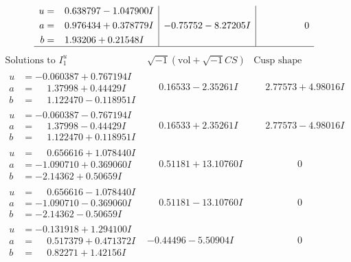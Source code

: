 \documentclass[1p]{elsarticle_modified}
\theoremstyle{definition}
\newcommand{\I}{\sqrt{-1}}
\begin{document}
$$\begin{array}{c|c|c}
\begin{aligned}
u &= \phantom{-}0.638797 - 1.047900 I \\
a &= \phantom{-}0.976434 + 0.378779 I \\
b &= \phantom{-}1.93206 + 0.21548 I\end{aligned}
 & -0.75752 - 8.27205 I & \phantom{-0.000000 } 0\\
 \hline 
 \end{array}$$\newpage$$\begin{array}{c|c|c}  
\text{Solutions to }I^u_{1}& \I (\text{vol} + \sqrt{-1}CS) & \text{Cusp shape}\\
 \hline 
\begin{aligned}
u &= -0.060387 + 0.767194 I \\
a &= \phantom{-}1.37998 + 0.44429 I \\
b &= \phantom{-}1.122470 - 0.118951 I\end{aligned}
 & \phantom{-}0.16533 - 2.35261 I & \phantom{-}2.77573 + 4.98016 I \\ \hline\begin{aligned}
u &= -0.060387 - 0.767194 I \\
a &= \phantom{-}1.37998 - 0.44429 I \\
b &= \phantom{-}1.122470 + 0.118951 I\end{aligned}
 & \phantom{-}0.16533 + 2.35261 I & \phantom{-}2.77573 - 4.98016 I \\ \hline\begin{aligned}
u &= \phantom{-}0.656616 + 1.078440 I \\
a &= -1.090710 + 0.369060 I \\
b &= -2.14362 + 0.50659 I\end{aligned}
 & \phantom{-}0.51181 + 13.10760 I & \phantom{-0.000000 } 0 \\ \hline\begin{aligned}
u &= \phantom{-}0.656616 - 1.078440 I \\
a &= -1.090710 - 0.369060 I \\
b &= -2.14362 - 0.50659 I\end{aligned}
 & \phantom{-}0.51181 - 13.10760 I & \phantom{-0.000000 } 0 \\ \hline\begin{aligned}
u &= -0.131918 + 1.294100 I \\
a &= \phantom{-}0.517379 + 0.471372 I \\
b &= \phantom{-}0.82271 + 1.42156 I\end{aligned}
 & -0.44496 - 5.50904 I & \phantom{-0.000000 } 0 \\ \hline\begin{aligned}

\end{aligned}
\end{array}$$
\end{document}
